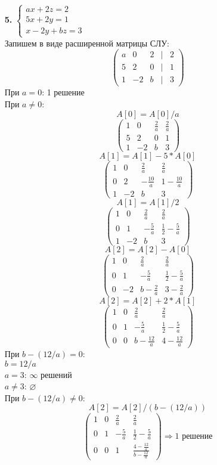\documentclass[a4paper]{article}
\renewcommand{\r}{\Rightarrow}
\begin{document}
\begin{enumerate}
    \item[\textbf{5.}]
    $\begin{cases}
        ax+2z=2\\
        5x+2y=1\\
        x-2y+bz=3
    \end{cases}$\\
    Запишем в виде расширенной матрицы СЛУ:\\
    $$
    \begin{pmatrix}
        a & 0 & 2 & | & 2 \\
        5 & 2 & 0 & | & 1 \\
        1 & -2 & b & | & 3
    \end{pmatrix}
    $$
    При $a=0$: 1 решение \\
    При $a \neq 0$:
    $$A[0] = A[0]/a$$
    $$
    \begin{pmatrix}
    1 & 0 & \frac{2}{a} & \frac{2}{a} \\
    5 & 2 & 0 & 1 \\
    1 & -2 & b & 3
    \end{pmatrix}
    $$
    $$A[1] = A[1]-5*A[0]$$
    $$
    \begin{pmatrix}
    1 & 0 & \frac{2}{a} & \frac{2}{a} \\
    0 & 2 & -\frac{10}{a} & 1 - \frac{10}{a} \\
    1 & -2 & b & 3
    \end{pmatrix}
    $$
    $$A[1] = A[1]/2$$
    $$
    \begin{pmatrix}
    1 & 0 & \frac{2}{a} & \frac{2}{a} \\
    0 & 1 & -\frac{5}{a} & \frac{1}{2} - \frac{5}{a} \\
    1 & -2 & b & 3
    \end{pmatrix}
    $$
    $$A[2] = A[2]-A[0]$$
    $$
    \begin{pmatrix}
    1 & 0 & \frac{2}{a} & \frac{2}{a} \\
    0 & 1 & -\frac{5}{a} & \frac{1}{2} - \frac{5}{a} \\
    0 & -2 & b - \frac{2}{a} & 3 - \frac{2}{a}
    \end{pmatrix}
    $$
    $$A[2] = A[2]+2*A[1]$$
    $$
    \begin{pmatrix}
    1 & 0 & \frac{2}{a} & \frac{2}{a} \\
    0 & 1 & -\frac{5}{a} & \frac{1}{2} - \frac{5}{a} \\
    0 & 0 & b - \frac{12}{a} & 4 - \frac{12}{a}
    \end{pmatrix}
    $$
    При $b-(12/a) = 0$:\\
    $b = 12/a$\\
    $a=3$: $\infty$ решений\\
    $a\neq3$: $\varnothing$ \\
    При $b-(12/a) \neq 0$:
    $$A[2] = A[2]/(b-(12/a))$$
    $$
    \begin{pmatrix}
    1 & 0 & \frac{2}{a} & \frac{2}{a} \\
    0 & 1 & -\frac{5}{a} & \frac{1}{2} - \frac{5}{a} \\
    0 & 0 & 1 & \frac{4 - \frac{12}{a}}{b - \frac{12}{a}}
    \end{pmatrix}
    \r \text{1 решение}$$


\end{enumerate}
\end{document}
